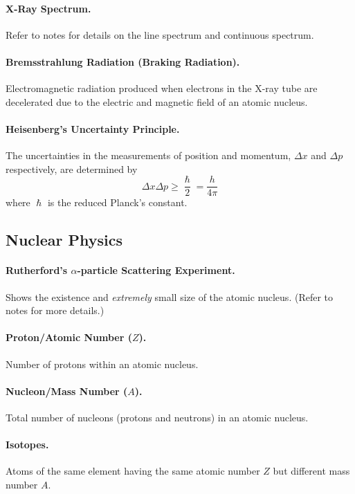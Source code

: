 \documentclass{article}
\begin{document}
\paragraph{X-Ray Spectrum.} Refer to notes for details on the line spectrum and
continuous spectrum.

\paragraph{Bremsstrahlung Radiation (Braking Radiation).} Electromagnetic
radiation produced when electrons in the X-ray tube are decelerated due to the
electric and magnetic field of an atomic nucleus.

\paragraph{Heisenberg's Uncertainty Principle.} The uncertainties in the
measurements of position and momentum, $\Delta x$ and $\Delta p$ respectively,
are determined by \begin{equation} \Delta x \Delta p \geq \frac{\hslash}{2} =
  \frac{h}{4\pi} \end{equation} where $\hslash$ is the reduced Planck's
  constant.

\subsection{Nuclear Physics}

\paragraph{Rutherford's $\alpha$-particle Scattering Experiment.} Shows the
existence and \textit{extremely} small size of the atomic nucleus. (Refer to notes for more
details.)

\paragraph{Proton/Atomic Number ($Z$).} Number of protons within an atomic
nucleus.

\paragraph{Nucleon/Mass Number ($A$).} Total number of nucleons (protons and
neutrons) in an atomic nucleus.

\paragraph{Isotopes.} Atoms of the same element having the same atomic number
$Z$ but different mass number $A$.
\end{document}
